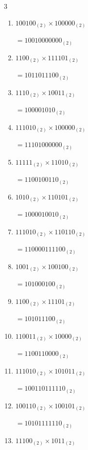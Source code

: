\begin{multicols}{3}
\begin{enumerate}
\columnbreak %

\resetques

  \item $100100_{(2)} \times 100000_{(2)}$

        $=10010000000_{(2)}$

  \item $1100_{(2)} \times 111101_{(2)}$

        $=1011011100_{(2)}$

  \item $1110_{(2)} \times 10011_{(2)}$

        $=100001010_{(2)}$

  \item $111010_{(2)} \times 100000_{(2)}$

        $=11101000000_{(2)}$

  \item $11111_{(2)} \times 11010_{(2)}$

        $=1100100110_{(2)}$

\columnbreak %

  \item $1010_{(2)} \times 110101_{(2)}$

        $=1000010010_{(2)}$

  \item $111010_{(2)} \times 110110_{(2)}$

        $=110000111100_{(2)}$

  \item $1001_{(2)} \times 100100_{(2)}$

        $=101000100_{(2)}$

  \item $1100_{(2)} \times 11101_{(2)}$

        $=101011100_{(2)}$

  \item $110011_{(2)} \times 10000_{(2)}$

        $=1100110000_{(2)}$

\columnbreak %

  \item $111010_{(2)} \times 101011_{(2)}$

        $=100110111110_{(2)}$

  \item $100110_{(2)} \times 100101_{(2)}$

        $=10101111110_{(2)}$

  \item $11100_{(2)} \times 1011_{(2)}$


\end{enumerate}
\end{multicols}
